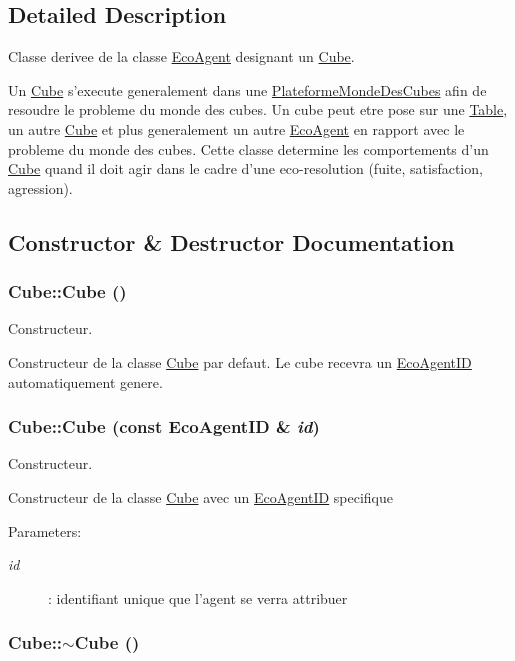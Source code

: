 \subsection{Detailed Description}
Classe derivee de la classe \hyperlink{classEcoAgent}{EcoAgent} designant un \hyperlink{classCube}{Cube}. 

Un \hyperlink{classCube}{Cube} s'execute generalement dans une \hyperlink{classPlateformeMondeDesCubes}{PlateformeMondeDesCubes} afin de resoudre le probleme du monde des cubes. Un cube peut etre pose sur une \hyperlink{classTable}{Table}, un autre \hyperlink{classCube}{Cube} et plus generalement un autre \hyperlink{classEcoAgent}{EcoAgent} en rapport avec le probleme du monde des cubes. Cette classe determine les comportements d'un \hyperlink{classCube}{Cube} quand il doit agir dans le cadre d'une eco-resolution (fuite, satisfaction, agression). 

\subsection{Constructor \& Destructor Documentation}
\hypertarget{classCube_06f3d86fb63e3aad08623610aa3c17b4}{
\subsubsection[{Cube}]{\setlength{\rightskip}{0pt plus 5cm}Cube::Cube ()}}
\label{classCube_06f3d86fb63e3aad08623610aa3c17b4}


Constructeur. 

Constructeur de la classe \hyperlink{classCube}{Cube} par defaut. Le cube recevra un \hyperlink{classEcoAgentID}{EcoAgentID} automatiquement genere. \hypertarget{classCube_4793068a114fd49b51233e8f81884189}{
\subsubsection[{Cube}]{\setlength{\rightskip}{0pt plus 5cm}Cube::Cube (const {\bf EcoAgentID} \& {\em id})}}
\label{classCube_4793068a114fd49b51233e8f81884189}


Constructeur. 

Constructeur de la classe \hyperlink{classCube}{Cube} avec un \hyperlink{classEcoAgentID}{EcoAgentID} specifique

\begin{Desc}
\item[Parameters:]
\begin{description}
\item[{\em id}]: identifiant unique que l'agent se verra attribuer \end{description}
\end{Desc}
\hypertarget{classCube_a814e979cecb8c451fdb332ded2cea1e}{
\subsubsection[{$\sim$Cube}]{\setlength{\rightskip}{0pt plus 5cm}Cube::$\sim$Cube ()}}
\label{classCube_a814e979cecb8c451fdb332ded2cea1e}


